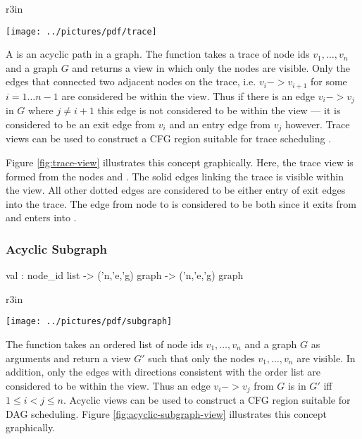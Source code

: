 \begin{wrapfigure}{r}{3in}
  \begin{Boxit}
  \texttt{[image: ../pictures/pdf/trace]}
  \end{Boxit}
  \label{fig:trace-view}
  \caption{A trace view}
\end{wrapfigure}
A  is an acyclic path in a graph.
The function  takes a trace of node ids
$v_1,\ldots,v_n$ and a graph $G$ and 
returns a view in which only the nodes are visible.
Only the edges that connected two adjacent nodes on the trace, i.e. 
$v_i -> v_{i+1}$ for some $i = 1 \ldots n-1$ are considered be within
the view.  Thus if there is an edge $v_i -> v_j$ in $G$ where
$j \ne i+1$ this edge is not considered to be within the view --- it
is considered to be an exit edge from $v_i$ and an entry edge
from $v_j$ however.  Trace views can be used to construct a CFG region
suitable for trace scheduling \cite{trace-scheduling,bulldog}.   

Figure \ref{fig:trace-view} illustrates this concept graphically.
Here, the trace view is formed from the
nodes  and .  The
solid edges linking the trace is visible within the view.  All other
dotted edges are considered to be either entry of exit edges into
the trace.  The edge from node  to  is considered to
be both since it exits from  and enters into .

\subsubsection{Acyclic Subgraph}
\begin{SML}
   val  : 
     node_id list -> 
     ('n,'e,'g) graph -> ('n,'e,'g) graph
\end{SML}
\begin{wrapfigure}{r}{3in}
  \begin{Boxit}
  \texttt{[image: ../pictures/pdf/subgraph]}
  \end{Boxit}
  \label{fig:acyclic-subgraph-view}
  \caption{An acyclic subgraph}
\end{wrapfigure}
The function  takes an ordered
list of node ids $v_1,\ldots,v_n$ and a graph $G$ as arguments
and return a view $G'$ such that only the nodes $v_1,\ldots,v_n$
are visible.  In addition, only the edges with directions consistent
with the order list are considered to be within the view.
Thus an edge $v_i -> v_j$ from $G$ is in $G'$ iff $1 \le i < j \le n$.
Acyclic views can be used to construct a CFG region suitable
for DAG scheduling.
Figure \ref{fig:acyclic-subgraph-view} illustrates this concept graphically.

